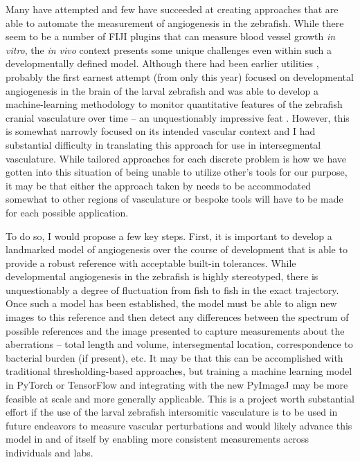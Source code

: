 Many have attempted and few have succeeded at creating approaches that are able to automate the measurement of angiogenesis in the zebrafish. While there seem to be a number of FIJI plugins that can measure blood vessel growth \textit{in vitro}, the \textit{in vivo} context presents some unique challenges even within such a developmentally defined model. Although there had been earlier utilities \citep{Heath2017}, probably the first earnest attempt (from only this year) focused on developmental angiogenesis in the brain of the larval zebrafish and was able to develop a machine\hyp{}learning methodology to monitor quantitative features of the zebrafish cranial vasculature over time -- an unquestionably impressive feat \citep{Kugler2022}. However, this is somewhat narrowly focused on its intended vascular context and I had substantial difficulty in translating this approach for use in intersegmental vasculature. While tailored approaches for each discrete problem is how we have gotten into this situation of being unable to utilize other's tools for our purpose, it may be that either the approach taken by \citeauthor{Kugler2022} needs to be accommodated somewhat to other regions of vasculature or bespoke tools will have to be made for each possible application. 

To do so, I would propose a few key steps. First, it is important to develop a landmarked model of angiogenesis over the course of development that is able to provide a robust reference with acceptable built\hyp{}in tolerances. While developmental angiogenesis in the zebrafish is highly stereotyped, there is unquestionably a degree of fluctuation from fish to fish in the exact trajectory. Once such a model has been established, the model must be able to align new images to this reference and then detect any differences between the spectrum of possible references and the image presented to capture measurements about the aberrations -- total length and volume, intersegmental location, correspondence to bacterial burden (if present), etc. It may be that this can be accomplished with traditional thresholding\hyp{}based approaches, but training a machine learning model in PyTorch or TensorFlow and integrating with the new PyImageJ may be more feasible at scale and more generally applicable. This is a project worth substantial effort if the use of the larval zebrafish intersomitic vasculature is to be used in future endeavors to measure vascular perturbations and would likely advance this model in and of itself by enabling more consistent measurements across individuals and labs. 

